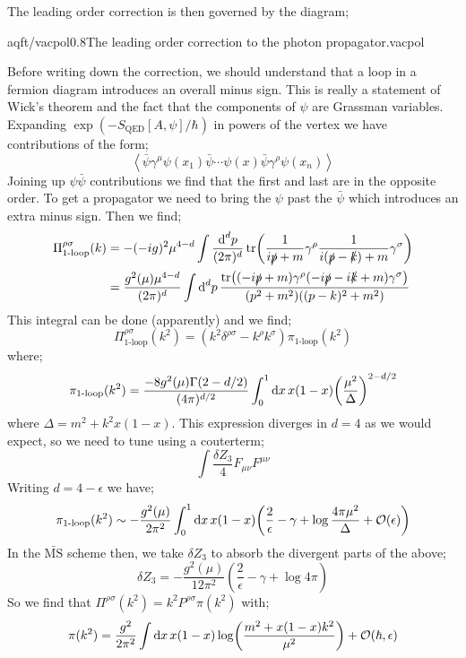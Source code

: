 The leading order correction is then governed by the diagram;
\begin{mygraphic}{aqft/vacpol}{0.8}{The leading order correction to the photon propagator.}{vacpol}\end{mygraphic}
Before writing down the correction, we should understand that a loop in a fermion diagram introduces an overall minus sign. This is really a statement of Wick's theorem and the fact that the components of $\psi$ are Grassman variables. Expanding $\exp\left(- S_{\text{QED}}[A, \psi]/\hbar\right)$ in powers of the vertex we have contributions of the form;
\begin{equation*}
\left< \bar{\psi} \gamma^{\mu}\psi(x_1) \bar{\psi} \cdots \psi(x) \bar{\psi}\gamma^{\rho}\psi(x_n) \right>
\end{equation*}
Joining up $\psi \bar{\psi}$ contributions we find that the first and last are in the opposite order. To get a propagator we need to bring the $\psi$ past the $\bar{\psi}$ which introduces an extra minus sign. Then we find;
\begin{align*}
\Pi^{\rho \sigma}_{\text{1-loop}}(k) &= -(-ig)^2 \mu^{4 - d}\int{\frac{\ud^d p}{(2\pi)^d}\tr\left(\frac{1}{i\slashed{p} + m}\gamma^{\rho}\frac{1}{i(\slashed{p} - \slashed{k}) + m}\gamma^{\sigma}\right)} \\
&= \frac{g^2(\mu)\mu^{4 - d}}{(2\pi)^d}\int{\upd{^d p}\frac{\tr \left((-i \slashed{p} + m)\gamma^{\rho}(-i \slashed{p} - i\slashed{k} + m)\gamma^{\sigma}\right)}{(p^2 + m^2)\left((p - k)^2 + m^2\right)}}
\end{align*}
This integral can be done (apparently) and we find;
\begin{equation}
\Pi_{\text{1-loop}}^{\rho\sigma}(k^2) = (k^2 \delta^{\rho\sigma} - k^{\rho}k^{\sigma})\pi_{\text{1-loop}}(k^2)
\end{equation}
where;
\begin{equation}
\pi_{\text{1-loop}}(k^2) = \frac{-8 g^{2}(\mu)\Gamma(2 - d/2)}{(4\pi)^{d/2}}\int_0^{1}{\upd{x} x(1 - x)\left(\frac{\mu^2}{\Delta}\right)^{2 - d/2}}
\end{equation}
where $\Delta = m^2 + k^2 x(1 - x)$. This expression diverges in $d = 4$ as we would expect, so we need to tune using a couterterm;
\begin{equation*}
\int{\frac{\delta Z_3}{4}F_{\mu\nu}F^{\mu\nu}}
\end{equation*}
Writing $d = 4 - \epsilon$ we have;
\begin{equation*}
\pi_{\text{1-loop}}(k^2) \sim -\frac{g^2(\mu)}{2\pi^2}\int_0^{1}{\upd{x}x(1 - x)\left(\frac{2}{\epsilon} - \gamma + \log \frac{4\pi \mu^2}{\Delta} + \mO(\epsilon)\right)}
\end{equation*}
In the $\bar{\text{MS}}$ scheme then, we take $\delta Z_3$ to absorb the divergent parts of the above;
\begin{equation}
\delta Z_3 = -\frac{g^2(\mu)}{12\pi^2}\left(\frac{2}{\epsilon} - \gamma + \log 4\pi\right)
\end{equation}
So we find that $\Pi^{\rho\sigma}(k^2) = k^2 P^{\rho\sigma}\pi(k^2)$ with;
\begin{equation}
\pi(k^2) = \frac{g^2}{2\pi^2}\int{\upd{x}x(1 - x)\log\left(\frac{m^2 + x(1 - x)k^2}{\mu^2}\right)} + \mO(\hbar, \epsilon)
\end{equation}
